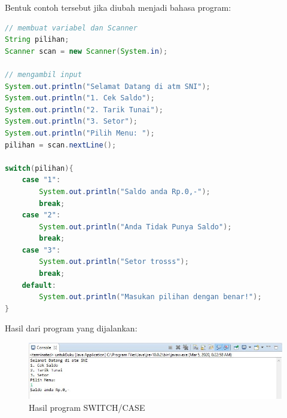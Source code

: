 \medskip

\noindent{}

\medskip

Bentuk contoh tersebut jika diubah menjadi bahasa program:
\begin{lstlisting}[language = Java]
// membuat variabel dan Scanner
String pilihan;
Scanner scan = new Scanner(System.in);

// mengambil input
System.out.println("Selamat Datang di atm SNI");
System.out.println("1. Cek Saldo");
System.out.println("2. Tarik Tunai");
System.out.println("3. Setor");
System.out.println("Pilih Menu: ");
pilihan = scan.nextLine();

switch(pilihan){
    case "1":
        System.out.println("Saldo anda Rp.0,-");
        break;
    case "2":
        System.out.println("Anda Tidak Punya Saldo");
        break;
    case "3":
        System.out.println("Setor trosss");
        break;
    default:
        System.out.println("Masukan pilihan dengan benar!");
}
\end{lstlisting}

Hasil dari program yang dijalankan: 
\begin{figure}[h!]
    \centering
    \includegraphics[scale=0.6]{pictures/hasil_switch_case.JPG}
    \caption{Hasil program SWITCH/CASE}
    \label{}
\end{figure}

\newpage
